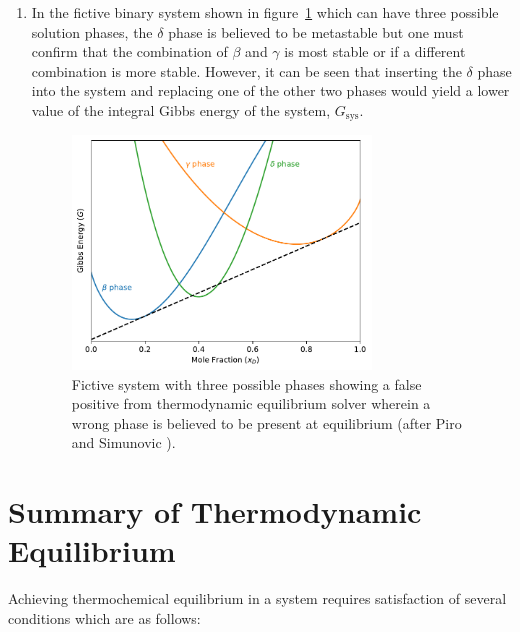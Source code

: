 \begin{enumerate}
	\item In the fictive binary system shown in figure~\ref{fig:go_sys-CD} which can have three possible solution phases, the $\delta$ phase is believed to be metastable but one must confirm that the combination of $\beta$ and $\gamma$ is most stable or if a different combination is more stable. However, it can be seen that inserting the $\delta$ phase into the system and replacing one of the other two phases would yield a lower value of the integral Gibbs energy of the system, $G_\text{sys}$.
		\begin{figure}[htbp]
		\centering
		\includegraphics[width=0.75\textwidth]{figures/chapter-4/System_CD.pdf}
		\caption{Fictive system with three possible phases showing a false positive from thermodynamic equilibrium solver wherein a wrong phase is believed to be present at equilibrium (after Piro and Simunovic \cite{Piro16}).}
		\label{fig:go_sys-CD}
	\end{figure}
	\end{enumerate}





\section{Summary of Thermodynamic Equilibrium}
Achieving thermochemical equilibrium in a system requires satisfaction of several conditions which are as follows:
